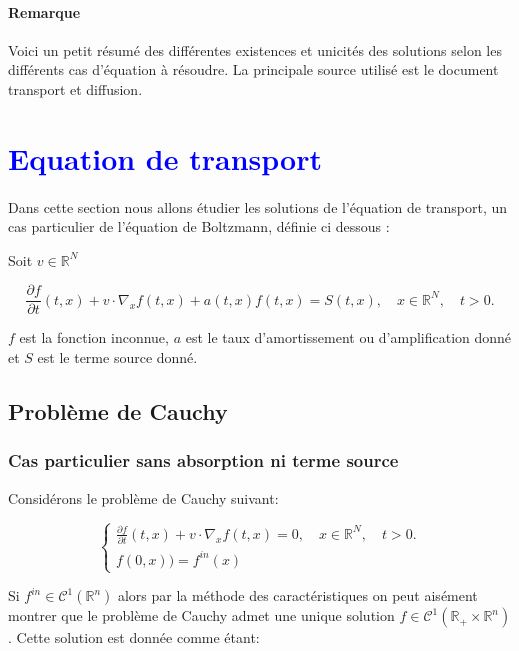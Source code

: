 \documentclass[onecolumn, 12pt, a4paper]{article}
\begin{document}
\newpage

\paragraph{Remarque} Voici un petit résumé des différentes existences et unicités des solutions selon les différents cas d'équation à résoudre. La principale source utilisé est le document transport et diffusion.

\section{\textcolor{blue}{Equation de transport}}

\paragraph{}
Dans cette section nous allons étudier les solutions de l'équation de transport, un cas particulier de l'équation de Boltzmann, définie ci dessous : 



Soit $v \in \mathbb{R}^N$

\begin{equation} \label{transport}
\frac{\partial f}{\partial t}(t,x)+v \cdot \nabla_x f(t,x) + a(t,x)f(t,x) = S(t,x), \quad x \in \mathbb{R}^N, \quad t>0.
\end{equation}


$f$ est la fonction inconnue, $a$ est le taux d'amortissement ou d'amplification donné et $S$ est le terme source donné.

\subsection{Problème de Cauchy}
\subsubsection{Cas particulier sans absorption ni terme source}

Considérons le problème de Cauchy suivant:

\[
\begin{cases}
\frac{\partial f}{\partial t}(t,x)+v \cdot \nabla_x f(t,x)=0, \quad x \in \mathbb{R}^N, \quad t>0.\\
f(0,x)) = f^{in}(x)
\end{cases}
\]

Si $f^{in} \in \mathcal{C}^1(\mathbb{R}^n)$ alors par la méthode des caractéristiques on peut aisément montrer que le problème de Cauchy admet une unique solution $f \in \mathcal{C}^1(\mathbb{R}_+ \times \mathbb{R}^n)$. Cette solution est donnée comme étant: \\
\end{document}
